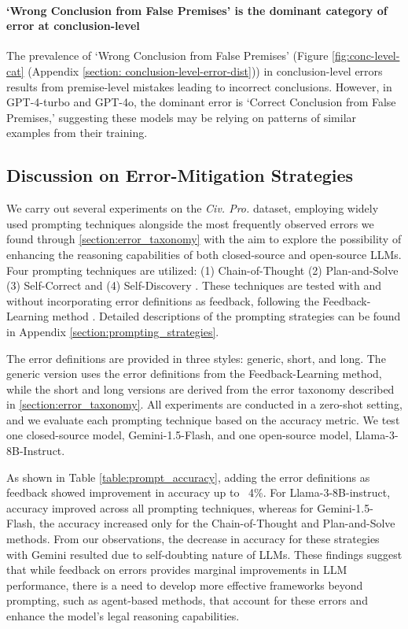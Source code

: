 \paragraph{`Wrong Conclusion from False Premises' is the dominant category of error at conclusion-level} The prevalence of `Wrong Conclusion from False Premises' (Figure \ref{fig:conc-level-cat} (Appendix \ref{section: conclusion-level-error-dist})) in conclusion-level errors results from premise-level mistakes leading to incorrect conclusions. However, in GPT-4-turbo and GPT-4o, the dominant error is `Correct Conclusion from False Premises,' suggesting these models may be relying on patterns of similar examples from their training.  

\subsection{Discussion on Error-Mitigation Strategies}
\label{section:mitigation_discussion}
We carry out several experiments on the \textit{Civ. Pro.} dataset, employing widely used prompting techniques alongside the most frequently observed errors we found through \textsection \ref{section:error_taxonomy} with the aim to explore the possibility of enhancing the reasoning capabilities of both closed-source and open-source LLMs. Four prompting techniques are utilized: (1) Chain-of-Thought \citep{wei2022chainofthought} (2) Plan-and-Solve \citep{wang2023plan} (3) Self-Correct  \citep{zhang2024smalllanguagemodelsneed} and (4) Self-Discovery  \citep{zhou2024selfdiscoverlargelanguagemodels}. These techniques are tested with and without incorporating error definitions as feedback, following the Feedback-Learning method \citep{tyagi2024stepbystepreasoningsolvegrid}. Detailed descriptions of the prompting strategies can be found in Appendix \ref{section:prompting_strategies}.

The error definitions are provided in three styles: generic, short, and long. The generic version uses the error definitions from the Feedback-Learning method, while the short and long versions are derived from the error taxonomy described in \textsection\ref{section:error_taxonomy}. All experiments are conducted in a zero-shot setting, and we evaluate each prompting technique based on the accuracy metric. We test one closed-source model, Gemini-1.5-Flash, and one open-source model, Llama-3-8B-Instruct.

As shown in Table \ref{table:prompt_accuracy}, adding the error definitions as feedback showed improvement in accuracy up to ~4\%. For Llama-3-8B-instruct, accuracy improved across all prompting techniques, whereas for Gemini-1.5-Flash, the accuracy increased only for the Chain-of-Thought and Plan-and-Solve methods. From our observations, the decrease in accuracy for these strategies with Gemini resulted due to self-doubting \citep{krishna2023intersectionselfcorrectiontrustlanguage} nature of LLMs. These findings suggest that while feedback on errors provides marginal improvements in LLM performance, there is a need to develop more effective frameworks beyond prompting, such as agent-based methods, that account for these errors and enhance the model’s legal reasoning capabilities.

